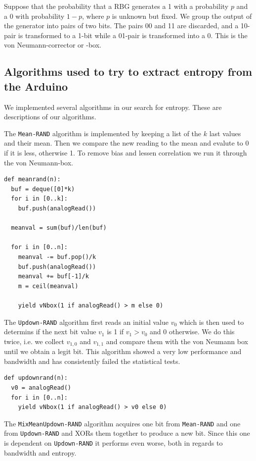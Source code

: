 \documentclass[a4paper]{article}           %
\begin{document}
Suppose that the probability that a RBG generates a 1 with a probability $p$ and a 0 with probability $1-p$, where $p$ is unknown but fixed. We group the output of the generator into pairs of two bits. The pairs 00 and 11 are discarded, and a 10-pair is transformed to a 1-bit while a 01-pair is transformed into a 0. This is the von Neumann-corrector\cite{menezes1996, intel} or -box. 

\subsection{Algorithms used to try to extract entropy from the Arduino}
\label{sec:algs}

We implemented several algorithms in our search for entropy. These are descriptions of our algorithms. 

The \texttt{Mean-RAND} algorithm is implemented by keeping a list of the $k$ last values and their mean. Then we compare the new reading to the mean and evalute to 0 if it is less, otherwise 1. To remove bias and lessen correlation we run it through the von Neumann-box. 

\begin{lstlisting}[caption=The \texttt{Mean-RAND} algorithm in Python-ish pseudocode]
def meanrand(n):
  buf = deque([0]*k)
  for i in [0..k]:
    buf.push(analogRead())

  meanval = sum(buf)/len(buf)

  for i in [0..n]:
    meanval -= buf.pop()/k
    buf.push(analogRead())
    meanval += buf[-1]/k
    m = ceil(meanval)

    yield vNbox(1 if analogRead() > m else 0)
  \end{lstlisting}

The \texttt{Updown-RAND} algorithm first reads an initial value $v_0$ which is then used to determins if the next bit value $v_1$ is 1 if $v_1 > v_0$ and 0 otherwise. We do this twice, i.e. we collect $v_{1,0}$ and $v_{1,1}$ and compare them with the von Neumann box until we obtain a legit bit. This algorithm showed a very low performance and bandwidth and has consistently failed the statistical tests. 

\begin{lstlisting}[caption=The \texttt{Updown-RAND} algorithm]
def updownrand(n):
  v0 = analogRead()
  for i in [0..n]:
    yield vNbox(1 if analogRead() > v0 else 0)
\end{lstlisting}

The \texttt{MixMeanUpdown-RAND} algorithm acquires one bit from \texttt{Mean-RAND} and one from \texttt{Updown-RAND} and XORs them together to produce a new bit. Since this one is dependent on \texttt{Updown-RAND} it performs even worse, both in regards to bandwidth and entropy. 
\end{document}
